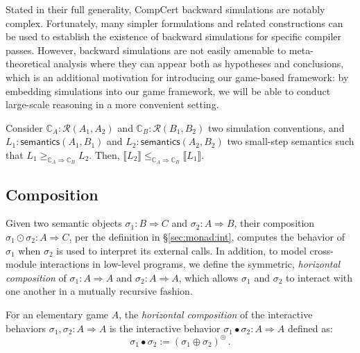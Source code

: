 \documentclass[acmsmall,timestamp,review,anonymous]{acmart}
\newcommand{\kw}[1]{\ensuremath{ \mathsf{#1} }}
\begin{document}
Stated in their full generality,
CompCert backward simulations are notably complex.
Fortunately,
many simpler formulations and related constructions
can be used to establish
the existence of backward simulations
for specific compiler passes.
However,
backward simulations are not easily amenable to
meta-theoretical analysis
where they can appear both as hypotheses and conclusions,
which is an additional motivation for introducing
our game-based framework:
by embedding simulations into our game framework,
we will be able to conduct large-scale reasoning
in a more convenient setting.

\begin{lemma}
Consider
$\mathbb{C}_A : \mathcal{R}(A_1, A_2)$ and
$\mathbb{C}_B : \mathcal{R}(B_1, B_2)$
two simulation conventions,
and
$L_1 : \kw{semantics}(A_1, B_1)$ and
$L_2 : \kw{semantics}(A_2, B_2)$
two small-step semantics
such that
$L_1 \ge_{\mathbb{C}_A \Rightarrow \mathbb{C}_B} L_2$.
Then,
$
    \llbracket L_2 \rrbracket
    \le_{\mathbb{C}_A \Rightarrow \mathbb{C}_B}
    \llbracket L_1 \rrbracket
$.
\end{lemma}


\subsection{Composition} \label{sec:modsem:comp} %

Given two semantic objects
$\sigma_1 : B \Rightarrow C$ and
$\sigma_2 : A \Rightarrow B$,
their composition $\sigma_1 \odot \sigma_2 : A \Rightarrow C$,
per the definition in \S\ref{sec:monad:int},
computes the behavior of $\sigma_1$ when $\sigma_2$ is used
to interpret its external calls.
In addition,
to model cross-module interactions in low-level programs,
we define the symmetric,
\emph{horizontal composition}
of
$\sigma_1 : A \Rightarrow A$ and
$\sigma_2 : A \Rightarrow A$,
which allows $\sigma_1$ and $\sigma_2$
to interact with one another
in a mutually recursive fashion.

\begin{definition}
For an elementary game $A$,
the \emph{horizontal composition} of the interactive behaviors
$\sigma_1, \sigma_2 : A \Rightarrow A$
is the interactive behavior
$\sigma_1 \bullet \sigma_2 : A \Rightarrow A$
defined as:
\[
    \sigma_1 \bullet \sigma_2 :=
      (\sigma_1 \oplus \sigma_2)^\circledcirc \,.
\]
\end{definition}
\end{document}
